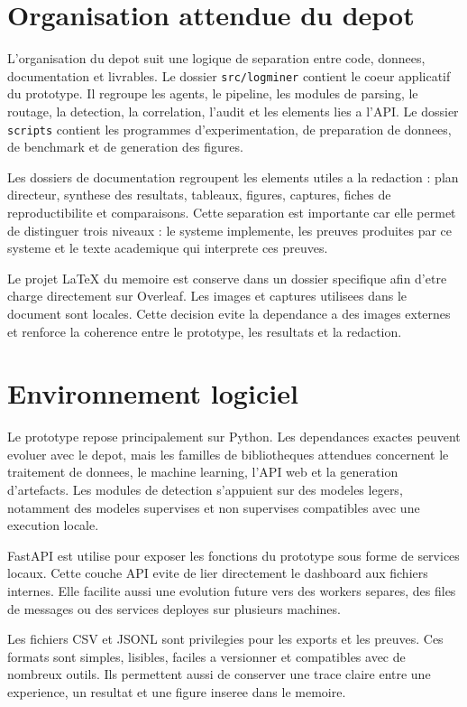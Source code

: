 \section{Organisation attendue du depot}
L'organisation du depot suit une logique de separation entre code, donnees, documentation et livrables. Le dossier \texttt{src/logminer} contient le coeur applicatif du prototype. Il regroupe les agents, le pipeline, les modules de parsing, le routage, la detection, la correlation, l'audit et les elements lies a l'API. Le dossier \texttt{scripts} contient les programmes d'experimentation, de preparation de donnees, de benchmark et de generation des figures.

Les dossiers de documentation regroupent les elements utiles a la redaction : plan directeur, synthese des resultats, tableaux, figures, captures, fiches de reproductibilite et comparaisons. Cette separation est importante car elle permet de distinguer trois niveaux : le systeme implemente, les preuves produites par ce systeme et le texte academique qui interprete ces preuves.

Le projet LaTeX du memoire est conserve dans un dossier specifique afin d'etre charge directement sur Overleaf. Les images et captures utilisees dans le document sont locales. Cette decision evite la dependance a des images externes et renforce la coherence entre le prototype, les resultats et la redaction.

\section{Environnement logiciel}
Le prototype repose principalement sur Python. Les dependances exactes peuvent evoluer avec le depot, mais les familles de bibliotheques attendues concernent le traitement de donnees, le machine learning, l'API web et la generation d'artefacts. Les modules de detection s'appuient sur des modeles legers, notamment des modeles supervises et non supervises compatibles avec une execution locale.

FastAPI est utilise pour exposer les fonctions du prototype sous forme de services locaux. Cette couche API evite de lier directement le dashboard aux fichiers internes. Elle facilite aussi une evolution future vers des workers separes, des files de messages ou des services deployes sur plusieurs machines.

Les fichiers CSV et JSONL sont privilegies pour les exports et les preuves. Ces formats sont simples, lisibles, faciles a versionner et compatibles avec de nombreux outils. Ils permettent aussi de conserver une trace claire entre une experience, un resultat et une figure inseree dans le memoire.

